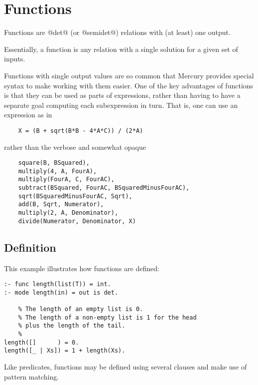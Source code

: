 
\chapter{Functions}

Functions are @det@ (or @semidet@) relations with (at least) one output.

Essentially, a function is any relation with a single solution for
a given set of inputs.

Functions with single output values are so common that Mercury provides
special syntax to make working with them easier.  One of the key
advantages of functions is that they can be used as parts of
expressions, rather than having to have a separate goal computing each
subexpression in turn.  That is, one can use an expression as in
\begin{verbatim}
    X = (B + sqrt(B*B - 4*A*C)) / (2*A)
\end{verbatim}
rather than the verbose and somewhat opaque
\begin{verbatim}
    square(B, BSquared),
    multiply(4, A, FourA),
    multiply(FourA, C, FourAC),
    subtract(BSquared, FourAC, BSquaredMinusFourAC),
    sqrt(BSquaredMinusFourAC, Sqrt),
    add(B, Sqrt, Numerator),
    multiply(2, A, Denominator),
    divide(Numerator, Denominator, X)
\end{verbatim}

\section{Definition}

This example illustrates how functions are defined:
\begin{verbatim}
:- func length(list(T)) = int.
:- mode length(in) = out is det.

    % The length of an empty list is 0.
    % The length of a non-empty list is 1 for the head
    % plus the length of the tail.
    %
length([]      ) = 0.
length([_ | Xs]) = 1 + length(Xs).
\end{verbatim}
Like predicates, functions may be defined using several clauses
and make use of pattern matching.

